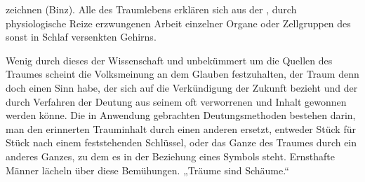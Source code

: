 \documentclass[twoside=true,titlepage=false,open=any, parskip=never, fontsize=10pt, headings=small, chapterprefix=false, appendixprefix=false]{scrbook}
\begin{document}
         
            
            
            
        \pstart
        zeichnen (Binz). Alle  des Traumlebens erklären sich aus der , durch physiologische Reize erzwungenen Arbeit einzelner Organe oder
               Zellgruppen des sonst in Schlaf versenkten Gehirns.
        \pend
    
            
        \pstart
        Wenig  durch dieses  der Wissenschaft und unbekümmert um die Quellen des Traumes  scheint die Volksmeinung an dem Glauben festzuhalten,  der Traum denn doch einen Sinn habe, der sich auf die Verkündigung der
               Zukunft bezieht  und der durch  Verfahren der Deutung aus seinem oft verworrenen und  Inhalt gewonnen werden könne. Die in Anwendung gebrachten
               Deutungsmethoden bestehen darin,  man den erinnerten Trauminhalt durch einen anderen ersetzt, entweder
               Stück für Stück nach einem feststehenden
                  Schlüssel, oder das Ganze des Traumes durch ein anderes Ganzes, zu dem
               es in der Beziehung eines Symbols steht.
               Ernsthafte Männer lächeln über diese Bemühungen. „Träume sind Schäume.“
        \pend
    
         
            
            
            \pstart{}\pend
            
\end{document}
